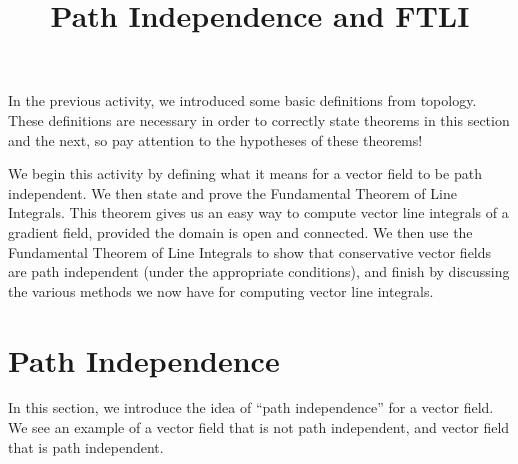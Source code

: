 \documentclass{ximera}
\title{Path Independence and FTLI}
\begin{document}
  
\begin{abstract}  
\end{abstract}  
\maketitle  

In the previous activity, we introduced some basic definitions from topology. These definitions are necessary in order to correctly state theorems in this section and the next, so pay attention to the hypotheses of these theorems!

We begin this activity by defining what it means for a vector field to be path independent. We then state and prove the Fundamental Theorem of Line Integrals. This theorem gives us an easy way to compute vector line integrals of a gradient field, provided the domain is open and connected. We then use the Fundamental Theorem of Line Integrals to show that conservative vector fields are path independent (under the appropriate conditions), and finish by discussing the various methods we now have for computing vector line integrals.

\section*{Path Independence}

In this section, we introduce the idea of ``path independence'' for a vector field. We see an example of a vector field that is not path independent, and vector field that is path independent.
\end{document}

